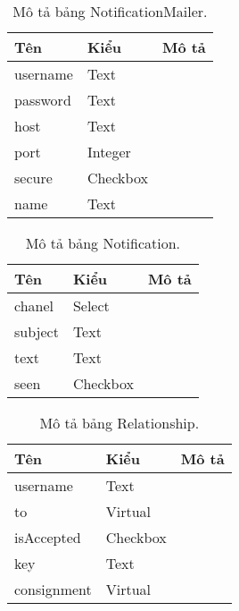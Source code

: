 \begin{table}[p]
	\begin{center}
		\begin{tabular}{ |l|l|l| } 
			\hline
			Tên & Kiểu & Mô tả \\
			\hline
			username & Text & \dotfill \\
			password & Text & \dotfill \\
			host & Text & \dotfill \\
			port & Integer & \dotfill \\
			secure & Checkbox & \dotfill \\
			name & Text & \dotfill \\ 
			\hline
		\end{tabular}
		\caption{Mô tả bảng NotificationMailer.}
		\label{table:NotificationMailer}
	\end{center}
\end{table}


\begin{table}[p]
	\begin{center}
		\begin{tabular}{ |l|l|l| } 
			\hline
			Tên & Kiểu & Mô tả \\
			\hline
			chanel & Select & \dotfill \\
			subject & Text & \dotfill \\
			text & Text & \dotfill \\
			seen & Checkbox & \dotfill \\ 
			\hline
		\end{tabular}
		\caption{Mô tả bảng Notification.}
		\label{table:Notification}
	\end{center}
\end{table}


\begin{table}[p]
	\begin{center}
		\begin{tabular}{ |l|l|l| } 
			\hline
			Tên & Kiểu & Mô tả \\
			\hline
			username & Text & \dotfill \\
			to & Virtual & \dotfill \\
			isAccepted & Checkbox & \dotfill \\
			key & Text & \dotfill \\
			consignment & Virtual & \dotfill \\ 
			\hline
		\end{tabular}
		\caption{Mô tả bảng Relationship.}
		\label{table:Relationship}
	\end{center}
\end{table}


